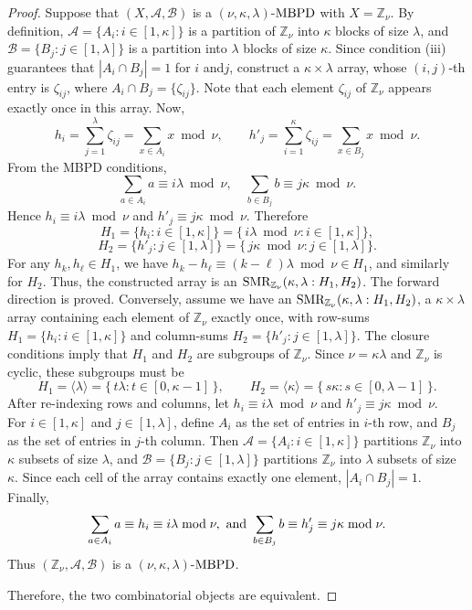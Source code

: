 \documentclass[preprint,11pt]{elsarticle}
\newcommand{\SMR}{\textnormal{SMR}}
\newcommand{\MBPD}{\textnormal{MBPD}}
\begin{document}
\begin{proof}
\smallskip
\par Suppose that $(X,\mathcal{A},\mathcal{B})$ is a 
$(\nu,\kappa,\lambda)$-$\MBPD$ with $X=\mathbb{Z}_\nu$.
By definition, $\mathcal{A}=\{A_i : i \in [1,\kappa]\}$ is a partition of 
$\mathbb{Z}_\nu$ into $\kappa$ blocks of size $\lambda$, and 
$\mathcal{B}=\{B_j: j \in [1, \lambda]\}$ is a partition into $\lambda$ blocks 
of size $\kappa$. Since condition (iii) guarantees that 
$|A_i\cap B_j|=1$ for $i$ and$j$, construct a 
$\kappa\times\lambda$ array, whose $(i,j)$-th entry is  $\zeta_{ij}$, where  
$A_i\cap B_j=\{\zeta_{ij}\}$. Note that each element $\zeta_{ij}$ of $\mathbb{Z}_\nu$ 
appears exactly once in this array. Now, 
\[
h_i=\sum_{j=1}^\lambda \zeta_{ij}
    = \sum_{x\in A_i} x \bmod{\nu}, 
\qquad 
h'_j=\sum_{i=1}^\kappa \zeta_{ij}
    = \sum_{x\in B_j} x \bmod{\nu}.
\]
From the MBPD conditions,
\[
\sum_{a\in A_i}a \equiv i\lambda \bmod{\nu}, \quad
\sum_{b\in B_j}b \equiv j\kappa \bmod{\nu}.
\]
Hence $h_i \equiv i\lambda \bmod{\nu}$ and 
$h'_j \equiv j\kappa \bmod{\nu}$. Therefore
\[
H_1=\{h_i: i \in [1,\kappa]\}
=\{\,i\lambda \bmod{\nu} : i\in [1,\kappa]\},
\]
\[
H_2=\{h'_j: j\in[1,\lambda]\}
=\{\,j\kappa \bmod{\nu} : j\in[1,\lambda]\}.
\]
For any $h_k,h_\ell \in H_1$, we have
$h_k-h_\ell \equiv (k-\ell)\lambda \bmod{\nu} \in H_1$, 
and similarly for $H_2$. Thus, the constructed array is an 
$\SMR_{\mathbb{Z}_\nu}(\kappa,\lambda:H_1,H_2)$. The forward direction is proved. 
 Conversely, assume we have an 
$\SMR_{\mathbb{Z}_\nu}(\kappa,\lambda:H_1,H_2)$, 
a $\kappa\times\lambda$ array containing each element of $\mathbb{Z}_\nu$ 
exactly once, with row-sums $H_1=\{h_i: i \in [1,\kappa]\}$ 
and column-sums $H_2=\{h'_j: j\in[1,\lambda]\}$.
The closure conditions imply that $H_1$ and $H_2$ 
are subgroups of $\mathbb{Z}_\nu$. Since $\nu=\kappa\lambda$ and 
$\mathbb{Z}_\nu$ is cyclic, these subgroups must be
\[
H_1 = \langle \lambda \rangle = 
\{\,t\lambda : t\in [0,\kappa-1]\,\}, \qquad
H_2 = \langle \kappa \rangle = 
\{\,s\kappa : s\in[0,\lambda-1]\,\}.
\]
After re-indexing rows and columns, let 
$h_i\equiv i\lambda \bmod{\nu}$ and 
$h'_j\equiv j\kappa \bmod{\nu}$. \\
For $i\in [1,\kappa]$ and $j\in[ 1, \lambda]$, define  $A_i$ as the set of entries in $i$-th row, and $B_j$ as the set of 
entries in $j$-th column. Then $\mathcal{A}=\{A_i: i\in [1,\kappa]\}$ partitions $\mathbb{Z}_\nu$ 
into $\kappa$ subsets of size $\lambda$, and $\mathcal{B}=\{B_j:j\in[ 1, \lambda]\}$ partitions 
$\mathbb{Z}_\nu$ into $\lambda$ subsets of size $\kappa$.  
Since each cell of the array contains exactly one 
element, $|A_i\cap B_j|=1$. Finally,
\[
\sum_{a\in A_i}a \equiv h_i \equiv i\lambda \bmod{\nu}, \textnormal{~and~}
\sum_{b\in B_j}b \equiv h'_j \equiv j\kappa \bmod{\nu}.
\]
Thus $(\mathbb{Z}_\nu,\mathcal{A},\mathcal{B})$ is a 
$(\nu,\kappa,\lambda)$-$\MBPD$.

\smallskip
\noindent Therefore, the two  combinatorial objects are equivalent.
\end{proof}
\end{document}
